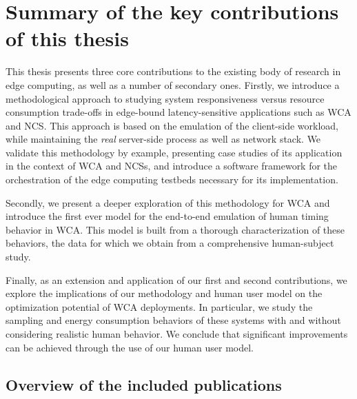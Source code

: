 \section{Summary of the key contributions of this thesis}\label{sec:summary_contributions}


This thesis presents three core contributions to the existing body of research in edge computing, as well as a number of secondary ones.
Firstly, we introduce a methodological approach to studying system responsiveness versus resource consumption trade-offs in edge-bound latency-sensitive applications such as \gls{WCA} and \gls{NCS}.
This approach is based on the emulation of the client-side workload, while maintaining the \emph{real} server-side process as well as network stack.
We validate this methodology by example, presenting case studies of its application in the context of \gls{WCA} and \glspl{NCS}, and introduce a software framework for the orchestration of the edge computing testbeds necessary for its implementation.

Secondly, we present a deeper exploration of this methodology for \gls{WCA} and introduce the first ever model for the end-to-end emulation of human timing behavior in \gls{WCA}.
This model is built from a thorough characterization of these behaviors, the data for which we obtain from a comprehensive human-subject study.

Finally, as an extension and application of our first and second contributions, we explore the implications of our methodology and human user model on the optimization potential of \gls{WCA} deployments.
In particular, we study the sampling and energy consumption behaviors of these systems with and without considering realistic human behavior.
We conclude that significant improvements can be achieved through the use of our human user model.

\subsection{Overview of the included publications}

